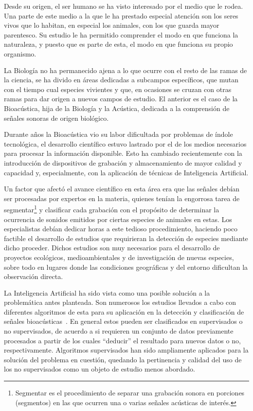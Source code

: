 
Desde su origen, el ser humano se ha visto interesado por el medio que le rodea.
Una parte de este medio a la que le ha prestado especial atención son los seres vivos que lo habitan, en especial los animales, con los que guarda mayor parentesco.
Su estudio le ha permitido comprender el modo en que funciona la naturaleza, y puesto que es parte de esta, el modo en que funciona su propio organismo.

La Biología no ha permanecido ajena a lo que ocurre con el resto de las ramas de la ciencia, se ha divido en áreas dedicadas a subcampos específicos, que mutan con el tiempo cual especies vivientes y que, en ocasiones se cruzan con otras ramas para dar origen a nuevos campos de estudio.
El anterior es el caso de la Bioacústica, hija de la Biología y la Acústica, dedicada a la comprensión de señales sonoras de origen biológico.

Durante años la Bioacústica vio su labor dificultada por problemas de índole tecnológica, el desarrollo científico estuvo lastrado por el de los medios necesarios para procesar la información disponible.
Esto ha cambiado recientemente con la introducción de dispositivos de grabación y almacenamiento de mayor calidad y capacidad y, especialmente, con la aplicación de técnicas de Inteligencia Artificial.

Un factor que afectó el avance científico en esta área era que las señales debían ser procesadas por expertos en la materia, quienes tenían la engorrosa tarea de segmentar\footnote{Segmentar es el procedimiento de separar una grabación sonora en porciones (segmentos) en las que ocurren una o varias señales acústicas de interés.} y clasificar cada grabación con el propósito de determinar la ocurrencia de sonidos emitidos por ciertas especies de animales en estas.
Los especialistas debían dedicar horas a este tedioso procedimiento, haciendo poco factible el desarrollo de estudios que requirieran la detección de especies mediante dicho proceder.
Dichos estudios son muy necesarios para el desarrollo de proyectos ecológicos, medioambientales y de investigación de nuevas especies, sobre todo en lugares donde las condiciones geográficas y del entorno dificultan la observación directa.

La Inteligencia Artificial ha sido vista como una posible solución a la problemática antes planteada.
Son numerosos los estudios llevados a cabo con diferentes algoritmos de esta para su aplicación en la detección y clasificación de señales bioacústicas~\cite{Gerhard03}.
En general estos pueden ser clasificados en supervisados o no supervisados, de acuerdo a si requieren un conjunto de datos previamente procesados a partir de los cuales “deducir” el resultado para nuevos datos o no, respectivamente.
Algoritmos supervisados han sido ampliamente aplicados para la solución del problema en cuestión, quedando la pertinencia y calidad del uso de los no supervisados como un objeto de estudio menos abordado.

